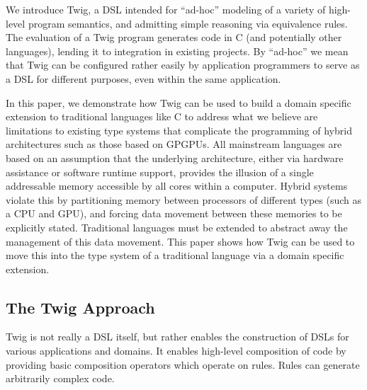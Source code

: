 We introduce Twig, a DSL intended for ``ad-hoc'' modeling of a variety of
high-level program semantics, and admitting simple reasoning via equivalence
rules. The evaluation of a Twig program generates code in C (and potentially
other languages), lending it to integration in existing projects. By
``ad-hoc'' we mean that Twig can be configured rather easily by application
programmers to serve as a DSL for different purposes, even within the same
application.

In this paper, we demonstrate how Twig can be used to build a domain specific
extension to traditional languages like C to address what we believe are
limitations to existing type systems that complicate the programming of hybrid
architectures such as those based on GPGPUs. All mainstream languages are
based on an assumption that the underlying architecture, either via hardware
assistance or software runtime support, provides the illusion of a single
addressable memory accessible by all cores within a computer. Hybrid systems
violate this by partitioning memory between processors of different types
(such as a CPU and GPU), and forcing data movement between these memories to
be explicitly stated. Traditional languages must be extended to abstract away
the management of this data movement. This paper shows how Twig can be used to
move this into the type system of a traditional language via a domain specific
extension.

\subsection{The Twig Approach}

Twig is not really a DSL itself, but rather enables the construction of DSLs
for various applications and domains. It enables high-level composition of
code by providing basic composition operators which operate on rules. Rules
can generate arbitrarily complex code.
